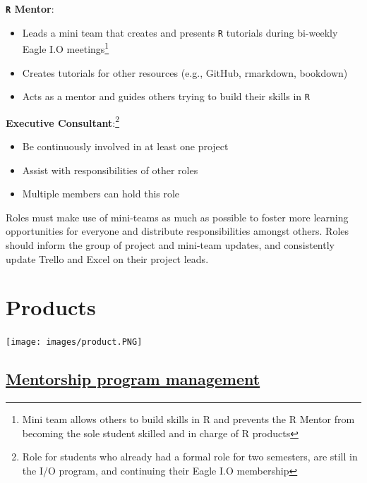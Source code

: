 \documentclass[
]{book}
\providecommand{\tightlist}{%
  \setlength{\itemsep}{0pt}\setlength{\parskip}{0pt}}
\begin{document}
\textbf{\texttt{R} Mentor}:

\begin{itemize}
\tightlist
\item
  Leads a mini team that creates and presents \texttt{R} tutorials during bi-weekly Eagle I.O meetings\footnote{Mini team allows others to build skills in R and prevents the R Mentor from becoming the sole student skilled and in charge of R products}
\item
  Creates tutorials for other resources (e.g., GitHub, rmarkdown, bookdown)\\
\item
  Acts as a mentor and guides others trying to build their skills in \texttt{R}
\end{itemize}

\textbf{Executive Consultant}:\footnote{Role for students who already had a formal role for two semesters, are still in the I/O program, and continuing their Eagle I.O membership}

\begin{itemize}
\tightlist
\item
  Be continuously involved in at least one project
\item
  Assist with responsibilities of other roles\\
\item
  Multiple members can hold this role
\end{itemize}

Roles must make use of mini-teams as much as possible to foster more learning opportunities for everyone and distribute responsibilities amongst others. Roles should inform the group of project and mini-team updates, and consistently update Trello and Excel on their project leads.

\hypertarget{products}{%
\chapter{Products}\label{products}}

\texttt{[image: images/product.PNG]}

\hypertarget{mentorship-program-management}{%
\section{\texorpdfstring{\href{https://bookdown.org/kulasj/mentoruser/}{Mentorship program management}}{Mentorship program management}}\label{mentorship-program-management}}
\end{document}
